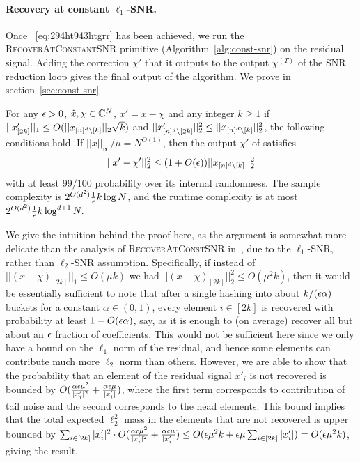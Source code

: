 \paragraph{ Recovery at constant $\ell_1$-SNR.} Once ~\eqref{eq:294ht943htgrr} has been achieved, we run the \textsc{RecoverAtConstantSNR} primitive (Algorithm~\ref{alg:const-snr}) on the residual signal. Adding the correction $\chi'$ that it outputs to the output $\chi^{(T)}$ of the SNR reduction loop gives the final output of the algorithm. We prove in section~\ref{sec:const-snr}
\begin{lemma}\label{lm:const-snr}
For any ${\epsilon}>0$, $\hat x, \chi\in \mathbb{C}^N$, $x'=x-\chi$ and any integer $k\geq 1$ if $||x'_{[2k]}||_1\leq O(||x_{{[n]^d}\setminus [k]}||_2\sqrt{k})$ and $||x'_{{[n]^d}\setminus [2k]}||_2^2\leq ||x_{{[n]^d}\setminus [k]}||_2^2$, the following conditions hold. If $||x||_\infty/\mu=N^{O(1)}$, then the output $\chi'$ of 
 satisfies
$$
||x'-\chi'||^2_2\leq (1+O({\epsilon}))||x_{{[n]^d}\setminus [k]}||_2^2
$$
with at least $99/100$ probability over its internal randomness. The sample complexity is $2^{O(d^2)}\frac1{{\epsilon}}  k\log N$, and the runtime complexity is at most $2^{O(d^2)}\frac1{{\epsilon}}  k \log^{d+1} N.$
\end{lemma}
We give the intuition behind the proof here, as the argument is somewhat more delicate than the analysis of \textsc{RecoverAtConstSNR} in~\cite{IKP}, due to the $\ell_1$-SNR, rather than $\ell_2$-SNR assumption.
Specifically, if instead of $||(x-\chi)_{[2k]}||_1\leq O(\mu k)$ we had $||(x-\chi)_{[2k]}||_2^2\leq O(\mu^2 k)$, then it would be essentially sufficient to note that after a single hashing into about $k/({\epsilon}\alpha)$ buckets for a constant $\alpha\in (0, 1)$, every element $i\in [2k]$ is recovered with probability at least $1-O({\epsilon}\alpha)$, say, as it is enough to (on average) recover all but about an ${\epsilon}$ fraction of coefficients. This would not be sufficient here since we only have a bound on the $\ell_1$ norm of the residual, and hence some elements can contribute much more $\ell_2$ norm than others. However, we are able to show that the probability that an element of the residual signal $x'_i$ is not recovered is bounded by
$O(\frac{\alpha {\epsilon} \mu^2}{|x'_i|^2}+\frac{\alpha {\epsilon} \mu}{|x'_i|})$, where the first term corresponds to contribution of tail noise and the second corresponds to the head elements. This bound implies that the total expected $\ell_2^2$ mass in the elements that are not recovered  is upper bounded by 
$\sum_{i\in [2k]} |x'_i|^2\cdot O(\frac{\alpha {\epsilon} \mu^2}{|x'_i|^2}+\frac{\alpha {\epsilon} \mu}{|x'_i|})\leq O({\epsilon} \mu^2 k+{\epsilon}\mu \sum_{i\in [2k]} |x'_i|)=O({\epsilon} \mu^2 k)$, giving the result.

